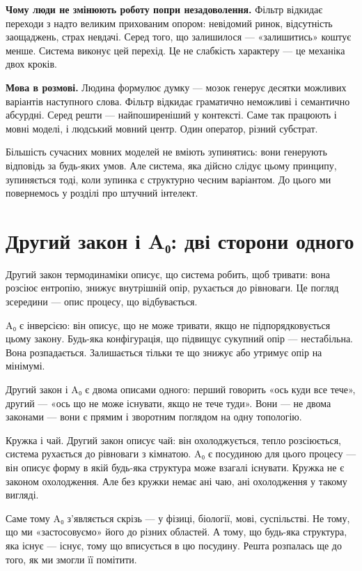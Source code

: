 \documentclass[12pt, a4paper, openany]{book}
\begin{document}
\textbf{Чому люди не змінюють роботу попри незадоволення.} Фільтр відкидає переходи з надто великим прихованим опором: невідомий ринок, відсутність заощаджень, страх невдачі. Серед того, що залишилося --- «залишитись» коштує менше. Система виконує цей перехід. Це не слабкість характеру --- це механіка двох кроків.

\textbf{Мова в розмові.} Людина формулює думку --- мозок генерує десятки можливих варіантів наступного слова. Фільтр відкидає граматично неможливі і семантично абсурдні. Серед решти --- найпоширеніший у контексті. Саме так працюють і мовні моделі, і людський мовний центр. Один оператор, різний субстрат.

Більшість сучасних мовних моделей не вміють зупинятись: вони генерують відповідь за будь-яких умов. Але система, яка дійсно слідує цьому принципу, зупиняється тоді, коли зупинка є структурно чесним варіантом. До цього ми повернемось у розділі про штучний інтелект.

\section{Другий закон і A₀: дві сторони одного}

Другий закон термодинаміки описує, що система робить, щоб тривати: вона розсіює ентропію, знижує внутрішній опір, рухається до рівноваги. Це погляд зсередини — опис процесу, що відбувається.

A₀ є інверсією: він описує, що не може тривати, якщо не підпорядковується цьому закону. Будь-яка конфігурація, що підвищує сукупний опір — нестабільна. Вона розпадається. Залишається тільки те що знижує або утримує опір на мінімумі.

Другий закон і A₀ є двома описами одного: перший говорить «ось куди все тече», другий — «ось що не може існувати, якщо не тече туди». Вони — не двома законами — вони є прямим і зворотним поглядом на одну топологію.

\begin{analogybox}
Кружка і чай. Другий закон описує чай: він охолоджується, тепло розсіюється, система рухається до рівноваги з кімнатою. A₀ є посудиною для цього процесу — він описує форму в якій будь-яка структура може взагалі існувати. Кружка не є законом охолодження. Але без кружки немає ані чаю, ані охолодження у такому вигляді.
\end{analogybox}

Саме тому A₀ з'являється скрізь — у фізиці, біології, мові, суспільстві. Не тому, що ми «застосовуємо» його до різних областей. А тому, що будь-яка структура, яка існує — існує, тому що вписується в цю посудину. Решта розпалась ще до того, як ми змогли її помітити.
\end{document}
